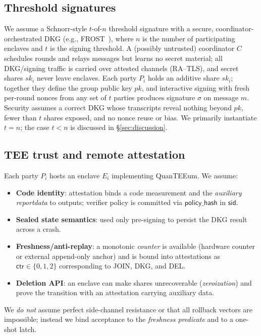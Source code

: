 \documentclass[runningheads,orivec]{llncs}
\newcommand{\prot}{\textsf{QuanTEEum}}
\begin{document}
\subsection{Threshold signatures}
We assume a Schnorr-style $t$-of-$n$ threshold signature with a secure, coordinator-orchestrated DKG (e.g., FROST~\cite{komlo2020frost}), where $n$ is the number of participating enclaves and $t$ is the signing threshold. A (possibly untrusted) coordinator $C$ schedules rounds and relays messages but learns no secret material; all DKG/signing traffic is carried over attested channels (RA--TLS), and secret shares $sk_i$ never leave enclaves. Each party $P_i$ holds an additive share $sk_i$; together they define the group public key $pk$, and interactive signing with fresh per-round nonces from any set of $t$ parties produces signature $\sigma$ on message $m$. Security assumes a correct DKG whose transcripts reveal nothing beyond $pk$, fewer than $t$ shares exposed, and no nonce reuse or bias. We primarily instantiate $t{=}n$; the case $t{<}n$ is discussed in \S\ref{sec:discussion}.

\subsection{TEE trust and remote attestation}
Each party $P_i$ hosts an enclave $E_i$ implementing \prot{}. We assume:
\begin{itemize}[leftmargin=*,itemsep=0.25em]
  \item \textbf{Code identity}: attestation binds a code measurement and the \emph{auxiliary reportdata} to outputs; verifier policy is committed via $\mathsf{policy\_hash}$ in $\mathsf{sid}$.
  \item \textbf{Sealed state semantics}: used only pre-signing to persist the DKG result across a crash.
  \item \textbf{Freshness/anti-replay}: a monotonic \emph{counter} is available (hardware counter or external append-only anchor) and is bound into attestations as $\mathsf{ctr}\in\{0,1,2\}$ corresponding to JOIN, DKG, and DEL.
  \item \textbf{Deletion API}: an enclave can make shares unrecoverable (\emph{zeroization}) and prove the transition with an attestation carrying auxiliary data.
\end{itemize}
We \emph{do not} assume perfect side-channel resistance or that all rollback vectors are impossible; instead we bind acceptance to the \emph{freshness predicate} and to a one-shot latch.
\end{document}
